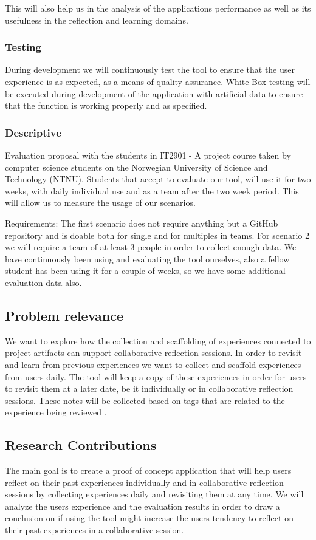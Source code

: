 This will also help us in the analysis of the applications performance as well as its usefulness in the reflection and learning domains.

\subsubsection{Testing}
During development we will continuously test the tool to ensure that the user experience is as expected, as a means of quality assurance.
White Box testing will be executed during development of the application with artificial data to ensure that the function is working properly and as specified. 

\subsubsection{Descriptive}
Evaluation proposal with the students in IT2901 - A project course taken by computer science students on the Norwegian University of Science and Technology (NTNU). 
Students that accept to evaluate our tool, will use it for two weeks, with daily individual use and as a team after the two week period. This will allow us to measure the usage of our scenarios. 

Requirements: 
The first scenario does not require anything but a GitHub repository and is doable both for single and for multiples in teams.
For scenario 2 we will require a team of at least 3 people in order to collect enough data. 
We have continuously been using and evaluating the tool ourselves, also a fellow student has been using it for a couple of weeks, so we have some additional evaluation
data also.


\subsection{Problem relevance}
We want to explore how the collection and scaffolding of experiences connected to project artifacts can support collaborative reflection sessions. In order to revisit and learn from previous experiences we want to collect and scaffold experiences from users daily. The tool will keep a copy of these experiences in order for users to revisit them at a later date, be it individually or in collaborative reflection sessions. These notes will be collected based on tags that are related to the experience being reviewed \citep{Hassan-montero2006}.

\subsection{Research Contributions}
The main goal is to create a proof of concept application that will help users reflect on their past experiences individually and in collaborative reflection sessions by collecting experiences daily and revisiting them at any time. We will analyze the users experience and the evaluation results in order to draw a conclusion on if using the tool might increase the users tendency to reflect on their past experiences in a collaborative session.

